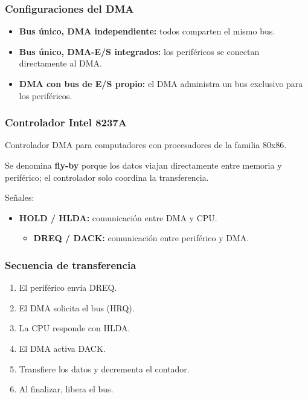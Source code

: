 \documentclass{article}
\begin{document}
\subsubsection{Configuraciones del DMA}
\label{sec:org7fc2a9d}
\begin{itemize}
\item \textbf{\textbf{Bus único, DMA independiente:}} todos comparten el mismo bus.
\item \textbf{\textbf{Bus único, DMA-E/S integrados:}} los periféricos se conectan directamente al DMA.
\item \textbf{\textbf{DMA con bus de E/S propio:}} el DMA administra un bus exclusivo para los periféricos.
\end{itemize}

\subsubsection{Controlador Intel 8237A}
\label{sec:orge01f4e0}
Controlador DMA para computadores con procesadores de la familia 80x86.

Se denomina \textbf{\textbf{fly-by}} porque los datos viajan directamente entre memoria y periférico; el controlador solo coordina la transferencia.

Señales:
\begin{itemize}
\item \textbf{\textbf{HOLD / HLDA:}} comunicación entre DMA y CPU.
\begin{itemize}
\item \textbf{\textbf{DREQ / DACK:}} comunicación entre periférico y DMA.
\end{itemize}
\end{itemize}

\subsubsection{Secuencia de transferencia}
\label{sec:org834aded}
\begin{enumerate}
\item El periférico envía DREQ.
\item El DMA solicita el bus (HRQ).
\item La CPU responde con HLDA.
\item El DMA activa DACK.
\item Transfiere los datos y decrementa el contador.
\item Al finalizar, libera el bus.
\end{enumerate}
\end{document}
